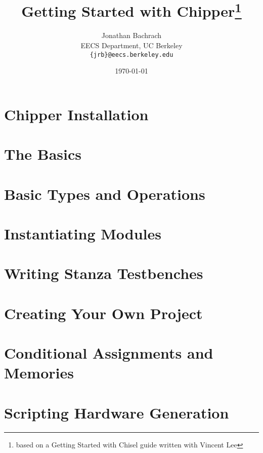 \documentclass[twocolumn, 10pt]{book}
\title{Getting Started with Chipper\footnote{based on a Getting Started with Chisel guide written with Vincent Lee}}
\author{Jonathan Bachrach \\
EECS Department, UC Berkeley\\
{\tt  \{jrb\}@eecs.berkeley.edu}
}
\date{\today}
\begin{document}
\maketitle{}

\chapter{Chipper Installation}


\chapter{The Basics}


\chapter{Basic Types and Operations}


\chapter{Instantiating Modules}


\chapter{Writing Stanza Testbenches}


\chapter{Creating Your Own Project}


\chapter{Conditional Assignments and Memories}


\chapter{Scripting Hardware Generation}

\end{document}

